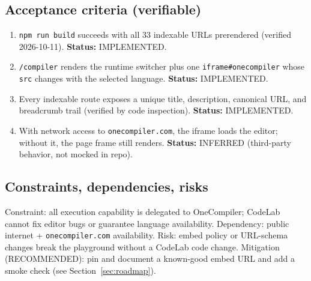 \subsection{Acceptance criteria (verifiable)}
\begin{enumerate}
\item \texttt{npm run build} succeeds with all 33 indexable URLs prerendered (verified 2026-10-11). \textbf{Status:} IMPLEMENTED.
\item \texttt{/compiler} renders the runtime switcher plus one \texttt{iframe\#onecompiler} whose \texttt{src} changes with the selected language. \textbf{Status:} IMPLEMENTED.
\item Every indexable route exposes a unique title, description, canonical URL, and breadcrumb trail (verified by code inspection). \textbf{Status:} IMPLEMENTED.
\item With network access to \texttt{onecompiler.com}, the iframe loads the editor; without it, the page frame still renders. \textbf{Status:} INFERRED (third-party behavior, not mocked in repo).
\end{enumerate}

\subsection{Constraints, dependencies, risks}
Constraint: all execution capability is delegated to OneCompiler; CodeLab cannot fix editor bugs or guarantee language availability. Dependency: public internet + \texttt{onecompiler.com} availability. Risk: embed policy or URL-schema changes break the playground without a CodeLab code change. Mitigation (RECOMMENDED): pin and document a known-good embed URL and add a smoke check (see Section~\ref{sec:roadmap}).
